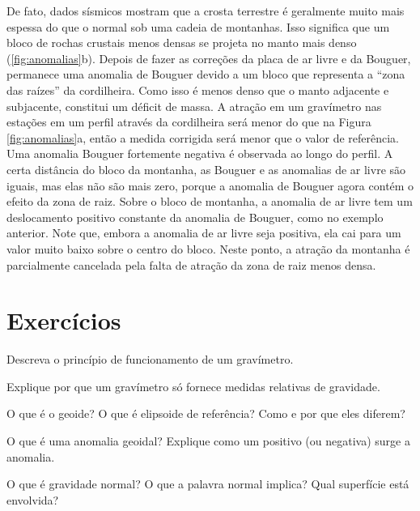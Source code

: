 \documentclass[]{book}
\theoremstyle{definition}
\theoremstyle{definition}
\theoremstyle{definition}
\theoremstyle{remark}
\let\BeginKnitrBlock\begin \let\EndKnitrBlock\end
\begin{document}
De fato, dados sísmicos mostram que a crosta terrestre é geralmente muito mais espessa do que o normal sob uma cadeia de montanhas. Isso significa que um bloco de rochas crustais menos densas se projeta no manto mais denso (\ref{fig:anomalias}b). Depois de fazer as correções da placa de ar livre e da Bouguer, permanece uma anomalia de Bouguer devido a um bloco que representa a ``zona das raízes'' da cordilheira. Como isso é menos denso que o manto adjacente e subjacente, constitui um déficit de massa. A atração em um gravímetro nas estações em um perfil através da cordilheira será menor do que na Figura \ref{fig:anomalias}a, então a medida corrigida será menor que o valor de referência. Uma anomalia Bouguer fortemente negativa é observada ao longo do perfil. A certa distância do bloco da montanha, as Bouguer e as anomalias de ar livre são iguais, mas elas não são mais zero, porque a anomalia de Bouguer agora contém o efeito da zona de raiz. Sobre o bloco de montanha, a anomalia de ar livre tem um deslocamento positivo constante da anomalia de Bouguer, como no exemplo anterior. Note que, embora a anomalia de ar livre seja positiva, ela cai para um valor muito baixo sobre o centro do bloco. Neste ponto, a atração da montanha é parcialmente cancelada pela falta de atração da zona de raiz menos densa.

\hypertarget{exercicios}{%
\section{Exercícios}\label{exercicios}}

\BeginKnitrBlock{exercise}
\protect\hypertarget{exr:exr1}{}{\label{exr:exr1} } Descreva o princípio de funcionamento de um gravímetro.
\EndKnitrBlock{exercise}

\BeginKnitrBlock{exercise}
\protect\hypertarget{exr:exr2}{}{\label{exr:exr2} }Explique por que um gravímetro só fornece medidas relativas de gravidade.
\EndKnitrBlock{exercise}

\BeginKnitrBlock{exercise}
\protect\hypertarget{exr:exr3}{}{\label{exr:exr3} }O que é o geoide? O que é elipsoide de referência? Como e por que eles diferem?
\EndKnitrBlock{exercise}

\BeginKnitrBlock{exercise}
\protect\hypertarget{exr:exr4}{}{\label{exr:exr4} } O que é uma anomalia geoidal? Explique como um positivo (ou negativa) surge a anomalia.
\EndKnitrBlock{exercise}

\BeginKnitrBlock{exercise}
\protect\hypertarget{exr:exr5}{}{\label{exr:exr5} }O que é gravidade normal? O que a palavra normal implica? Qual superfície está envolvida?
\EndKnitrBlock{exercise}
\end{document}
